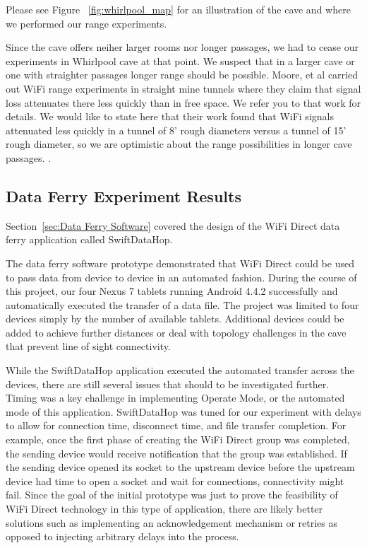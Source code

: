 \documentclass[10pt,twocolumn]{article}
\begin{document}
Please see Figure ~\ref{fig:whirlpool_map} for an illustration of the cave and where we performed our range experiments.

Since the cave offers neiher larger rooms nor longer passages, we had to cease our experiments in Whirlpool cave at that point.
We suspect that in a larger cave or one with straighter passages longer range should be possible.
Moore, et al carried out WiFi range experiments in straight mine tunnels where they claim that signal loss attenuates there less quickly than in free space.
We refer you to that work for details.
We would like to state here that their work found that WiFi signals attenuated less quickly in a tunnel of 8' rough diameters versus a tunnel of 15' rough diameter, so we are optimistic about the range possibilities in longer cave passages. \cite{moore2012}.

\subsection{Data Ferry Experiment Results}
\label{sec:Data Ferry Experiment Results}
Section~\ref{sec:Data Ferry Software} covered the design of the WiFi Direct data ferry application called SwiftDataHop. 

The data ferry software prototype demonstrated that WiFi Direct could be used to pass data from device to device in an automated fashion. 
During the course of this project, our four Nexus 7 tablets running Android 4.4.2 successfully and automatically executed the transfer of a data file.
The project was limited to four devices simply by the number of available tablets.
Additional devices could be added to achieve further distances or deal with topology challenges in the cave that prevent line of sight connectivity. 

While the SwiftDataHop application executed the automated transfer across the devices, there are still several issues that should to be investigated further.
Timing was a key challenge in implementing Operate Mode, or the automated mode of this application.
SwiftDataHop was tuned for our experiment with delays to allow for connection time, disconnect time, and file transfer completion.
For example, once the first phase of creating the WiFi Direct group was completed, the sending device would receive notification that the group was established.  
If the sending device opened its socket to the upstream device before the upstream device had time to open a socket and wait for connections, connectivity might fail.
Since the goal of the initial prototype was just to prove the feasibility of WiFi Direct technology in this type of application, there are likely better solutions such as implementing an acknowledgement mechanism or retries as opposed to injecting arbitrary delays into the process. 
\end{document}
